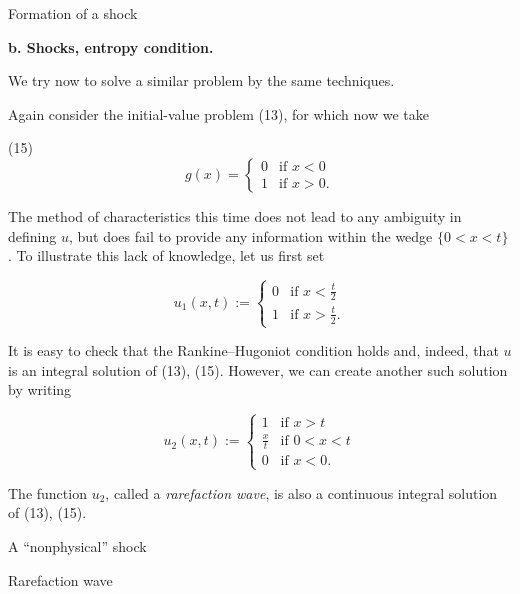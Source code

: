 Formation of a shock

\textbf{b. Shocks, entropy condition.}

We try now to solve a similar problem by the same techniques.

\begin{example}
\label{ex:rarefaction-nonphysical-shock}
Again consider the initial-value problem (13), for which now we take

(15)
$$g(x) = \begin{cases} 0 & \text{if } x < 0 \\ 1 & \text{if } x > 0. \end{cases}$$

The method of characteristics this time does not lead to any ambiguity in defining $u$, but does fail to provide any information within the wedge $\{0 < x < t\}$. To illustrate this lack of knowledge, let us first set

$$u_1(x,t) := \begin{cases} 0 & \text{if } x < \frac{t}{2} \\ 1 & \text{if } x > \frac{t}{2}. \end{cases}$$

It is easy to check that the Rankine--Hugoniot condition holds and, indeed, that $u$ is an integral solution of (13), (15). However, we can create another such solution by writing

$$u_2(x,t) := \begin{cases} 1 & \text{if } x > t \\ \frac{x}{t} & \text{if } 0 < x < t \\ 0 & \text{if } x < 0. \end{cases}$$

The function $u_2$, called a \textit{rarefaction wave}, is also a continuous integral solution of (13), (15).

\begin{figure}[h]\centering
\end{figure}

A ``nonphysical'' shock

\begin{figure}[h]\centering
\end{figure}

Rarefaction wave
\end{example}

